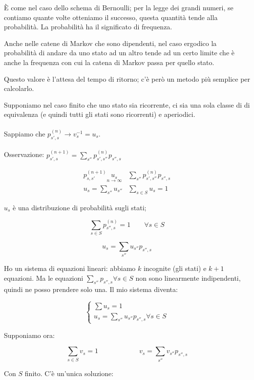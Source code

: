 \documentclass[a4paper,12pt]{book}
\begin{document}
È come nel caso dello schema di Bernoulli; per la legge dei grandi numeri, se contiamo quante volte otteniamo il successo, questa quantità tende alla probabilità. La probabilità ha il significato di frequenza.

Anche nelle catene di Markov che sono dipendenti, nel caso ergodico la probabilità di andare da uno stato ad un altro tende ad un certo limite che è anche la frequenza con cui la catena di Markov passa per quello stato. 

Questo valore è l'attesa del tempo di ritorno; c'è però un metodo più semplice per calcolarlo. 

Supponiamo nel caso finito che uno stato sia ricorrente, ci sia una sola classe di di equivalenza (e quindi tutti gli stati sono ricorrenti) e aperiodici. 
\\ \\
Sappiamo che $ p_{s',s}^{(n)} \to v_s^{-1} = u_s $.
\\ \\
Osservazione: $ p_{s',s}^{(n+1)} = \sum_{s''} p_{s',s''}^{(n)} p_{s'',s} $

$$ \begin{array}{cc}
	p_{s,s'}^{(n+1)} \underset{n \to \infty}{u_s} & \sum_{s''}p_{s',s''}^{(n)} p_{s'',s} \\ 
	
	u_s = \sum_{s''} u_{s''} & \sum_{s \in S} u_s = 1
\end{array} $$

$ u_s $ è una distribuzione di probabilità sugli stati;

$$ \sum_{s \in S} p_{s'', s}^{(n)} = 1 \qquad \forall s \in S $$

$$ u_s = \sum_{s''} u_{s''}p_{s'',s}$$

Ho un sistema di equazioni lineari: abbiamo $ k $ incognite (gli stati) e $ k+1 $ equazioni. Ma le equazioni $ \sum_{s''} p_{s'', s}  \forall s \in S$ non sono linearmente indipendenti, quindi ne posso prendere solo una. Il mio sistema diventa:

$$ 
\begin{cases} \sum u_s = 1 \\ u_s = \sum_{s''} u_{s''}p_{s'',s} \forall s \in S \end{cases} 
$$

Supponiamo ora:

$$ \sum_{s \in S} v_s = 1 \qquad \qquad \qquad v_s = \sum_{s''} v_{s''}p_{s'',s} $$

Con $ S $ finito. C'è un'unica soluzione:
\end{document}
